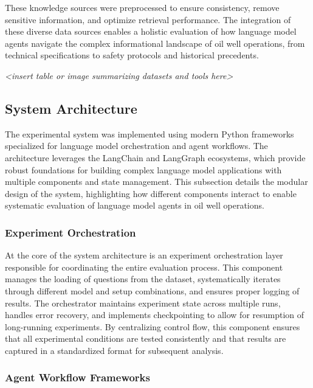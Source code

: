             These knowledge sources were preprocessed to ensure consistency, remove sensitive information, and optimize retrieval performance. The integration of these diverse data sources enables a holistic evaluation of how language model agents navigate the complex informational landscape of oil well operations, from technical specifications to safety protocols and historical precedents.

            \textit{<insert table or image summarizing datasets and tools here>}

        \subsection{System Architecture}

                The experimental system was implemented using modern Python frameworks specialized for language model orchestration and agent workflows. 
                The architecture leverages the LangChain and LangGraph ecosystems, which provide robust foundations for building complex language model applications with multiple components and state management.
                This subsection details the modular design of the system, highlighting how different components interact to enable systematic evaluation of language model agents in oil well operations.

            \subsubsection{Experiment Orchestration}

                At the core of the system architecture is an experiment orchestration layer responsible for coordinating the entire evaluation process. 
                This component manages the loading of questions from the dataset, systematically iterates through different model and setup combinations, and ensures proper logging of results. The orchestrator maintains experiment state across multiple runs, handles error recovery, and implements checkpointing to allow for resumption of long-running experiments. By centralizing control flow, this component ensures that all experimental conditions are tested consistently and that results are captured in a standardized format for subsequent analysis.

            \subsubsection{Agent Workflow Frameworks}

